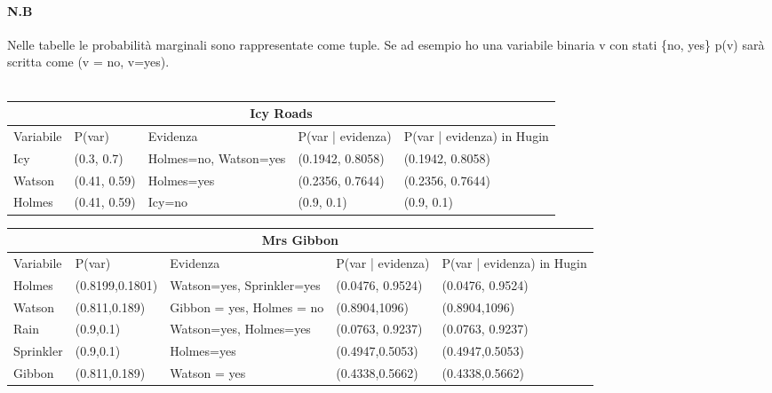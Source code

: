 \documentclass{report}
\begin{document}
\paragraph{N.B} 
Nelle tabelle le  probabilità marginali sono rappresentate come tuple. Se ad esempio ho una variabile binaria v con stati \{no, yes\} p(v) sarà scritta come (v = no, v=yes).\\\\
\begin{table}[tbh!]
\small
\begin{tabular}{ |p{2cm}||p{2cm}|p{2cm}|p{3cm}|p{3cm}|  }
\hline
 \multicolumn{5}{|c|}{Icy Roads} \\
 \hline
 Variabile & P(var) & Evidenza & P(var | evidenza) & P(var | evidenza)  in Hugin\\
 \hline
 Icy & (0.3, 0.7) & Holmes=no, Watson=yes & (0.1942, 0.8058) & (0.1942, 0.8058)\\
\hline
 Watson & (0.41, 0.59) & Holmes=yes & (0.2356, 0.7644) & (0.2356, 0.7644)\\
\hline
 Holmes & (0.41, 0.59) & Icy=no & (0.9, 0.1) & (0.9, 0.1)\\
\hline
\end{tabular}
\newline
\vspace*{0.5 cm}
\newline

\begin{tabular}{ |p{2cm}|p{2cm}|p{2cm}|p{3cm}|p{3cm}|  }
\hline
 \multicolumn{5}{|c|}{Mrs Gibbon} \\
 \hline
Variabile & P(var) & Evidenza & P(var | evidenza) & P(var | evidenza)  in Hugin\\
 \hline
Holmes &(0.8199,0.1801) & Watson=yes, Sprinkler=yes & (0.0476, 0.9524) &(0.0476, 0.9524)\\
\hline
Watson & (0.811,0.189) & Gibbon = yes, Holmes = no & (0.8904,1096)& (0.8904,1096)\\
\hline
Rain & (0.9,0.1) & Watson=yes, Holmes=yes & (0.0763, 0.9237) & (0.0763, 0.9237)\\
\hline
Sprinkler & (0.9,0.1) & Holmes=yes & (0.4947,0.5053) & (0.4947,0.5053)\\
\hline
Gibbon & (0.811,0.189) & Watson = yes & (0.4338,0.5662) & (0.4338,0.5662)\\
\hline
\end{tabular}
\end{table}
\newpage
\end{document}
